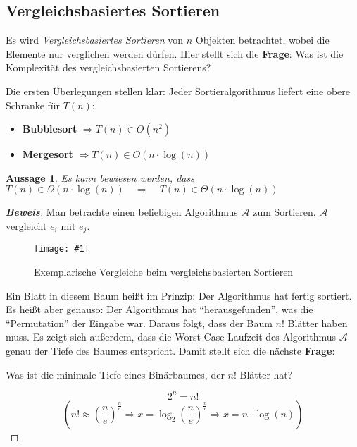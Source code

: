 \documentclass{scrartcl}%
\newtheorem{theorem}{Aussage}
\newcommand{\includepic}[2]{\texttt{[image: \#1]}}
\begin{document}
    \subsection*{Vergleichsbasiertes Sortieren}
    \label{subsec:vergleichsbasiertessortieren}

    Es wird \textit{Vergleichsbasiertes Sortieren} von $n$ Objekten betrachtet, wobei die Elemente nur verglichen werden dürfen.
    Hier stellt sich die \textbf{Frage}: Was ist die Komplexität des vergleichsbasierten Sortierens?

    Die ersten Überlegungen stellen klar: Jeder Sortieralgorithmus liefert eine obere Schranke für $T(n)$:
    \begin{itemize}
        \item \textbf{Bubblesort} $\Rightarrow T(n) \in O(n^2)$
        \item \textbf{Mergesort} $\Rightarrow T(n) \in O(n \cdot \log(n))$
    \end{itemize}
    \newpage
    \begin{theorem}
        Es kann bewiesen werden, dass $T(n) \in \Omega(n \cdot \log(n)) \quad \Rightarrow \quad T(n) \in \Theta(n \cdot \log(n))$
    \end{theorem}

    \begin{proof}[\textbf{Beweis}]
        Man betrachte einen beliebigen Algorithmus $\mathcal{A}$ zum Sortieren. $\mathcal{A}$ vergleicht $e_i$ mit $e_j$.

        \begin{figure}[htb]
            \centering
            \includepic{lec_03_a}{0.3}
            \caption{Exemplarische Vergleiche beim vergleichsbasierten Sortieren}
        \end{figure}

        Ein Blatt in diesem Baum heißt im Prinzip: Der Algorithmus hat fertig sortiert.
        Es heißt aber genauso: Der Algorithmus hat "`herausgefunden"', was die "`Permutation"' der Eingabe war.
        Daraus folgt, dass der Baum $n!$ Blätter haben muss.
        Es zeigt sich außerdem, dass die Worst-Case-Laufzeit des Algorithmus $\mathcal{A}$ genau der Tiefe des Baumes entspricht.
        Damit stellt sich die nächste \textbf{Frage}:

        Was ist die minimale Tiefe eines Binärbaumes, der $n!$ Blätter hat?

        \begin{equation*}
            2^n = n!
        \end{equation*}
        \begin{equation*}
            \left(n! \approx \left({\frac{n}{e}}\right)^{\frac{n}{e}} \Rightarrow x = \log_2\left(\frac{n}{e}\right)^{\frac{n}{e}}
            \Rightarrow x = n \cdot \log(n)\right)
        \end{equation*}

    \end{proof}
\end{document}
